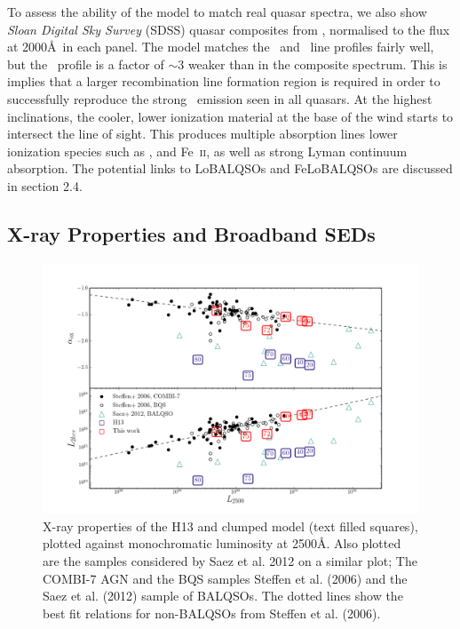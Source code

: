 \documentclass[preprint, a4paper, 11pt]{aastex}
\begin{document}
To assess the ability of the model to match real 
quasar spectra, we also show {\sl Sloan Digital Sky Survey} (SDSS) quasar composites from
\cite{reichard2003}, normalised to the flux at 2000\AA\ in each panel.
The model matches the \civ\ and \mg\ line profiles fairly well, 
but the \la\ profile is a factor of $\sim3$ weaker than in the composite spectrum.
This is implies that a larger recombination line formation region is required in order 
to successfully reproduce the strong \la\ emission seen in 
all quasars. At the highest inclinations, the 
cooler, lower ionization material at the base of the wind
starts to intersect the line of sight. This produces 
multiple absorption lines lower ionization species such as \mg,
\al and Fe~\textsc{ii}, as well as strong Lyman continuum absorption.
The potential links to LoBALQSOs and FeLoBALQSOs are discussed in section 2.4.


\subsection{X-ray Properties and Broadband SEDs}

\begin{figure} %
\centering
\includegraphics[width=1.0\textwidth]{figures/alpha_ox_both.png}
\caption
{
X-ray properties of the H13 and clumped model (text filled 
squares), plotted against monochromatic luminosity 
at 2500\AA. Also plotted are the samples considered by
Saez et al. 2012 on a similar plot; The COMBI-7 AGN and
the BQS samples Steffen et al. (2006) and the Saez et al. (2012) sample of BALQSOs.
The dotted lines show the best fit relations for non-BALQSOs from Steffen et al. (2006).
}
\label{fig:xray}
\end{figure} %
\end{document}
